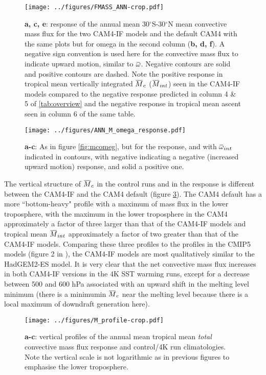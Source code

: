\documentclass[letterpaper,12pt,titlepage,oneside,final]{book}
\newcommand{\overbar}[1]{\mkern 1.5mu\overline{\mkern-1.5mu#1\mkern-1.5mu}\mkern 1.5mu}
\begin{document}
\begin{figure}[H]
\centering
\noindent\texttt{[image: ../figures/FMASS\_ANN-crop.pdf]}\hfill
\caption{\footnotesize \footnotesize\textbf{a, c, e}: response of the annual mean 30$^\circ$S-30$^\circ$N mean convective mass flux for the two CAM4-IF models and the default CAM4 with the same plots but for omega in the second column (\textbf{b, d, f}). A negative sign convention is used here for the convective mass flux to indicate upward motion, similar to $\overbar{\omega}$. Negative contours are solid and positive contours are dashed. Note the positive response in tropical mean vertically integrated $\overbar{M}_{c}$ ($\overbar{M}_{int}$) seen in the CAM4-IF models compared to the negative response predicted in column 4 \& 5 of \ref{tab:overview} and the negative response in tropical mean ascent seen in column 6 of the same table. }
\label{fig:Mc}
\end{figure}

\begin{figure}[H]
\centering
\noindent\texttt{[image: ../figures/ANN\_M\_omega\_response.pdf]}\hfill
\caption{\footnotesize \textbf{a-c}: As in figure \ref{fig:mcomeg}, but for the response, and with $\overbar{\omega}_{int}$ indicated in contours, with negative indicating a negative (increased upward motion) response, and solid a positive one.}
\label{fig:mcomegres}
\end{figure}

The vertical structure of $\overbar{M}_{c}$ in the control runs and in the response is different between the CAM4-IF and the CAM4 default (figure \ref{fig:mprofs}). The CAM4 default has a more ``bottom-heavy" profile with a maximum of mass flux in the lower troposphere, with the maximum in the lower troposphere in the CAM4 approximately a factor of three larger than that of the CAM4-IF models and tropical mean $\overbar{M}_{int}$ approximately a factor of two greater than that of the CAM4-IF models. Comparing these three profiles to the profiles in the CMIP5 models (figure 2 in \citet{chadwick_spatial_2012}), the CAM4-IF models are most qualitatively similar to the HadGEM2-ES model. It is very clear that the net convective mass flux increases in both CAM4-IF versions in the 4K SST warming runs, except for a decrease between 500 and 600 hPa associated with an upward shift in the melting level minimum (there is a minimumin $\overbar{M}_{c}$ near the melting level because there is a local maximum of downdraft generation here).
\begin{figure}[t]
\centering
\noindent\texttt{[image: ../figures/M\_profile-crop.pdf]}\hfill
\caption{\footnotesize \footnotesize \textbf{a-c}: vertical profiles of the annual mean tropical mean \textit{total} convective mass flux response and control/4K run climatologies. Note the vertical scale is not logarithmic as in previous figures to emphasise the lower troposphere.}
\label{fig:mprofs}
\end{figure}
\end{document}
